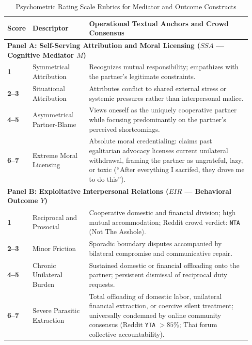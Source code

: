 \documentclass[11pt,a4paper]{article}
\begin{document}
\begin{table}[htbp]
\centering
\small
\caption{Psychometric Rating Scale Rubrics for Mediator and Outcome Constructs}
\label{tab:supp_rubric_ssa_eir}
\begin{tabularx}{\textwidth}{p{1.2cm}p{3.5cm}X}
\toprule
\textbf{Score} & \textbf{Descriptor} & \textbf{Operational Textual Anchors and Crowd Consensus} \\
\midrule
\multicolumn{3}{l}{\textbf{Panel A: Self-Serving Attribution and Moral Licensing ($SSA$ --- Cognitive Mediator $M$)}} \\
\midrule
\textbf{1} & Symmetrical Attribution & Recognizes mutual responsibility; empathizes with the partner's legitimate constraints. \\
\textbf{2--3} & Situational Attribution & Attributes conflict to shared external stress or systemic pressures rather than interpersonal malice. \\
\textbf{4--5} & Asymmetrical Partner-Blame & Views oneself as the uniquely cooperative partner while focusing predominantly on the partner's perceived shortcomings. \\
\textbf{6--7} & Extreme Moral Licensing & Absolute moral credentialing: claims past egalitarian advocacy licenses current unilateral withdrawal, framing the partner as ungrateful, lazy, or toxic (``After everything I sacrifed, they drove me to do this''). \\
\midrule
\multicolumn{3}{l}{\textbf{Panel B: Exploitative Interpersonal Relations ($EIR$ --- Behavioral Outcome $Y$)}} \\
\midrule
\textbf{1} & Reciprocal and Prosocial & Cooperative domestic and financial division; high mutual accommodation; Reddit crowd verdict: \texttt{NTA} (Not The Asshole). \\
\textbf{2--3} & Minor Friction & Sporadic boundary disputes accompanied by bilateral compromise and communicative repair. \\
\textbf{4--5} & Chronic Unilateral Burden & Sustained domestic or financial offloading onto the partner; persistent dismissal of reciprocal duty requests. \\
\textbf{6--7} & Severe Parasitic Extraction & Total offloading of domestic labor, unilateral financial extraction, or coercive silent treatment; universally condemned by online community consensus (Reddit \texttt{YTA} $> 85\%$; Thai forum collective accountability). \\
\bottomrule
\end{tabularx}
\end{table}
\end{document}
